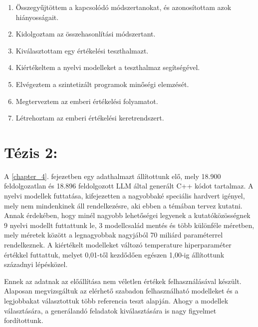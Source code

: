 \begin{enumerate}[wide = 0pt, widest = {I/4.}, leftmargin =*]
	
	\item[I/1.] Összegyűjtöttem a kapcsolódó módszertanokat, és azonosítottam azok hi\-á\-nyos\-sá\-ga\-it.
	
	\item[I/2.] Kidolgoztam az összehasonlítási módszertant.
	
	\item[I/3.] Kiválasztottam egy értékelési teszthalmazt.
	
	\item[I/4.] Kiértékeltem a nyelvi modelleket a teszthalmaz segítségével.
	
	\item[I/5.] Elvégeztem a szintetizált programok minőségi elemzését.
	
	\item[I/6.] Megterveztem az emberi értékelési folyamatot.
	
	\item[I/7.] Létrehoztam az emberi értékelési keretrendszert.
	
	
\end{enumerate}

\section*{Tézis 2: \thesispointtwohu}

A \ref{chapter_4}. fejezetben egy adathalmazt állítottunk elő, mely 18.900 fel\-dol\-go\-zat\-lan és 18.896 feldolgozott LLM által generált C++ kódot tartalmaz.
A nyelvi modellek futtatása, kifejezetten a nagyobbaké speciális hardvert igényel, mely nem mindenkinek áll rendelkezésre, aki ebben a témában tervez kutatni.
Annak érdekében, hogy minél nagyobb lehetőségei legyenek a kutatóközösségnek 9 nyelvi modellt futtattunk le, 3 modellcsalád mentés és több különféle méretben, mely méretek között a legnagyobbak nagyjából 70 miliárd paraméterrel rendelkeznek.
A kiértékelt modelleket változó temperature hiperparaméter értékkel futtattuk, melyet 0,01-től kezdődően egészen 1,00-ig állítottunk századnyi lépésközel.

Ennek az adatnak az előállítása nem véletlen értékek felhasználásával készült.
Alaposan megvizsgáltuk az elérhető szabadon felhasználható modelleket és a legjobbakat választottuk több referencia teszt alapján.
Ahogy a modellek választására, a generálandó feladatok kiválasztására is nagy figyelmet fordítottunk.

